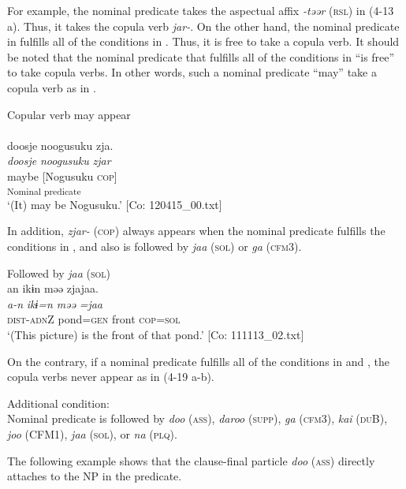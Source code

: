 For example, the nominal predicate takes the aspectual affix \textit{{}-təər} (\textsc{rsl}) in (4-13 a). Thus, it takes the copula verb \textit{jar-}. On the other hand, the nominal predicate in  fulfills all of the conditions in . Thus, it is free to take a copula verb. It should be noted that the nominal predicate that fulfills all of the conditions in  “is free” to take copula verbs. In other words, such a nominal predicate “may” take a copula verb as in .

\ea  Copular verb may appear \label{ex:4.16}\\\\
\gllll    doosje  noogusuku  zja.\\
    \textit{doosje}  \textit{noogusuku}  \textit{zjar}\\
    maybe  [Nogusuku  \textsc{cop}]\\
      [NP  Copular verb]\textsubscript{Nominal predicate}\\
    \glt     ‘(It) may be Nogusuku.’ [Co: 120415\_00.txt]
\z

  In addition, \textit{zjar-} (\textsc{cop}) always appears when the nominal predicate fulfills the conditions in , and also is followed by \textit{jaa} (\textsc{sol}) or \textit{ga} (\textsc{cfm}3).

\ea  Followed by \textit{jaa} (\textsc{sol}) \label{ex:4.17}\\
\glll  an  ikɨn  məə  zjajaa.\\
    \textit{a-n}  \textit{ikɨ=n}  \textit{məə}  \textit{=jaa}\\
    \textsc{dist}-\textsc{adn}Z  pond=\textsc{gen}  front  \textsc{cop}=\textsc{sol}\\
    \glt     ‘(This picture) is the front of that pond.’ [Co: 111113\_02.txt]
\z

  On the contrary, if a nominal predicate fulfills all of the conditions in  and , the copula verbs never appear as in (4-19 a-b).

\ea  Additional condition: \label{ex:4.18}\\
  Nominal predicate is followed by \textit{doo} (\textsc{ass}), \textit{daroo} (\textsc{supp}), \textit{ga} (\textsc{cfm}3), \textit{kai} (\textsc{du}B), \textit{joo} (CFM1), \textit{jaa} (\textsc{sol}), or \textit{na} (\textsc{plq}).
\z

The following example shows that the clause-final particle \textit{doo} (\textsc{ass}) directly attaches to the NP in the predicate.

